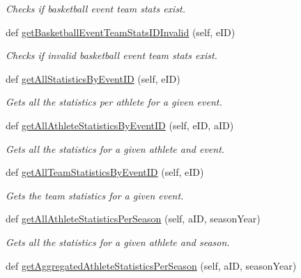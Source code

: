 \begin{DoxyCompactItemize}
\begin{DoxyCompactList}\small\item\em Checks if basketball event team stats exist. \end{DoxyCompactList}\item 
def \hyperlink{classhandler_1_1dao_1_1basketball__event__dao_1_1_basketball_event_d_a_o_ab4ea604d474379042c51ca75ff0aa4ed}{get\+Basketball\+Event\+Team\+Stats\+I\+D\+Invalid} (self, e\+ID)
\begin{DoxyCompactList}\small\item\em Checks if invalid basketball event team stats exist. \end{DoxyCompactList}\item 
def \hyperlink{classhandler_1_1dao_1_1basketball__event__dao_1_1_basketball_event_d_a_o_a572761553d62ca0471a9d24078e81811}{get\+All\+Statistics\+By\+Event\+ID} (self, e\+ID)
\begin{DoxyCompactList}\small\item\em Gets all the statistics per athlete for a given event. \end{DoxyCompactList}\item 
def \hyperlink{classhandler_1_1dao_1_1basketball__event__dao_1_1_basketball_event_d_a_o_ad880b1a4316cbfe009dc7b4628619862}{get\+All\+Athlete\+Statistics\+By\+Event\+ID} (self, e\+ID, a\+ID)
\begin{DoxyCompactList}\small\item\em Gets all the statistics for a given athlete and event. \end{DoxyCompactList}\item 
def \hyperlink{classhandler_1_1dao_1_1basketball__event__dao_1_1_basketball_event_d_a_o_ac0e9abba73e012d31064e6fa69a97f45}{get\+All\+Team\+Statistics\+By\+Event\+ID} (self, e\+ID)
\begin{DoxyCompactList}\small\item\em Gets the team statistics for a given event. \end{DoxyCompactList}\item 
def \hyperlink{classhandler_1_1dao_1_1basketball__event__dao_1_1_basketball_event_d_a_o_a6344ff81a10cbf1393461dafdd22eb05}{get\+All\+Athlete\+Statistics\+Per\+Season} (self, a\+ID, season\+Year)
\begin{DoxyCompactList}\small\item\em Gets all the statistics for a given athlete and season. \end{DoxyCompactList}\item 
def \hyperlink{classhandler_1_1dao_1_1basketball__event__dao_1_1_basketball_event_d_a_o_ac660899fcb4e4f8d782cf6963a6c9b91}{get\+Aggregated\+Athlete\+Statistics\+Per\+Season} (self, a\+ID, season\+Year)

\end{DoxyCompactItemize}
